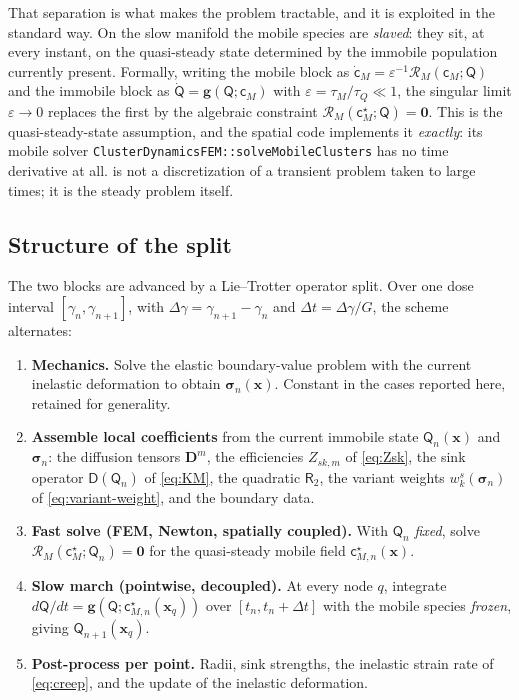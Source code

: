 \documentclass{article}
\newcommand{\spvec}[1]{\bm{\mathsf{#1}}}   %
\newcommand{\spmat}[1]{\bm{\mathsf{#1}}}   %
\newcommand{\code}[1]{\texttt{#1}}
\begin{document}
That separation is what makes the problem tractable, and it is exploited in the
standard way. On the slow manifold the mobile species are \emph{slaved}: they
sit, at every instant, on the quasi-steady state determined by the immobile
population currently present. Formally, writing the mobile block as
$\dot{\spvec c}_M=\varepsilon^{-1}\mathcal R_M(\spvec c_M;\spvec Q)$ and the
immobile block as $\dot{\spvec Q}=\mathbf g(\spvec Q;\spvec c_M)$ with
$\varepsilon=\tau_M/\tau_Q\ll1$, the singular limit $\varepsilon\to0$ replaces
the first by the algebraic constraint $\mathcal R_M(\spvec c_M^\star;\spvec
Q)=\mathbf 0$. This is the quasi-steady-state assumption, and the spatial code
implements it \emph{exactly}: its mobile solver
\code{ClusterDynamicsFEM::}\allowbreak\code{solveMobileClusters} has no time derivative at all.
 is not a discretization of a transient problem taken to large
times; it is the steady problem itself.

\subsection{Structure of the split}
\label{sec:split}

The two blocks are advanced by a Lie--Trotter operator split. Over one dose
interval $[\gamma_n,\gamma_{n+1}]$, with $\Delta\gamma=\gamma_{n+1}-\gamma_n$ and
$\Delta t=\Delta\gamma/G$, the scheme alternates:

\begin{enumerate}[label=\textbf{S\arabic*.}]
\item \textbf{Mechanics.} Solve the elastic boundary-value problem with the
current inelastic deformation to obtain $\bm\sigma_n(\bm x)$. Constant in the
cases reported here, retained for generality.
\item \textbf{Assemble local coefficients} from the current immobile state
$\spvec Q_n(\bm x)$ and $\bm\sigma_n$: the diffusion tensors $\bm D^m$, the
efficiencies $Z_{sk,m}$ of \cref{eq:Zsk}, the sink operator $\spmat D(\spvec
Q_n)$ of \cref{eq:KM}, the quadratic $\spmat R_2$, the variant weights
$w^s_k(\bm\sigma_n)$ of \cref{eq:variant-weight}, and the boundary data.
\item \textbf{Fast solve (FEM, Newton, spatially coupled).} With $\spvec Q_n$
\emph{fixed}, solve $\mathcal R_M(\spvec c_M^\star;\spvec Q_n)=\mathbf 0$ for the
quasi-steady mobile field $\spvec c^\star_{M,n}(\bm x)$.
\item \textbf{Slow march (pointwise, decoupled).} At every node $q$, integrate
$d\spvec Q/dt=\mathbf g(\spvec Q;\spvec c^\star_{M,n}(\bm x_q))$ over
$[t_n,t_n+\Delta t]$ with the mobile species \emph{frozen}, giving $\spvec
Q_{n+1}(\bm x_q)$.
\item \textbf{Post-process per point.} Radii, sink strengths, the inelastic
strain rate of \cref{eq:creep}, and the update of the inelastic deformation.
\end{enumerate}
\end{document}
